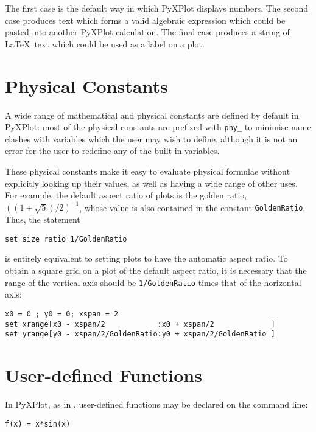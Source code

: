 The first case is the default way in which PyXPlot displays numbers. The second
case produces text which forms a valid algebraic expression which could be
pasted into another PyXPlot calculation. The final case produces a string of
\LaTeX\ text which could be used as a label on a plot.

\section{Physical Constants}
\label{sec:constants}

A wide range of mathematical and physical constants are defined by default in
PyXPlot: most of the physical constants are prefixed with {\tt phy\_} to
minimise name clashes with variables which the user may wish to define,
although it is not an error for the user to redefine any of the built-in
variables.

These physical constants make it easy to evaluate physical formulae without
explicitly looking up their values, as well as having a wide range of other
uses. For example, the default aspect ratio of plots is the golden ratio,
$\left((1+\sqrt{5})/2\right)^{-1}$, whose value is also contained in the
constant {\tt GoldenRatio}. Thus, the statement

\begin{verbatim}
set size ratio 1/GoldenRatio
\end{verbatim}

\noindent is entirely equivalent to setting plots to have the automatic aspect
ratio. To obtain a square grid on a plot of the default aspect ratio, it is
necessary that the range of the vertical axis should be {\tt 1/GoldenRatio}
times that of the horizontal axis:

\begin{verbatim}
x0 = 0 ; y0 = 0; xspan = 2
set xrange[x0 - xspan/2            :x0 + xspan/2             ]
set yrange[y0 - xspan/2/GoldenRatio:y0 + xspan/2/GoldenRatio ]
\end{verbatim}

\section{User-defined Functions}

In PyXPlot, as in \gnuplot, user-defined functions may be declared on the
command line:

\begin{verbatim}
f(x) = x*sin(x)
\end{verbatim}

